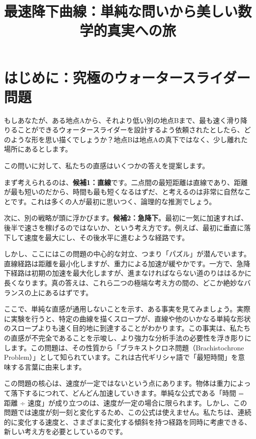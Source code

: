 \documentclass[12pt,a4paper]{ltjsarticle}
\title{最速降下曲線：単純な問いから美しい数学的真実への旅}
\author{}
\date{}
\begin{document}
\maketitle

\section{はじめに：究極のウォータースライダー問題}

もしあなたが、ある地点Aから、それより低い別の地点Bまで、最も速く滑り降りることができるウォータースライダーを設計するよう依頼されたとしたら、どのような形を思い描くでしょうか？地点Bは地点Aの真下ではなく、少し離れた場所にあるとします。

この問いに対して、私たちの直感はいくつかの答えを提案します。

まず考えられるのは、\textbf{候補1：直線}です。二点間の最短距離は直線であり、距離が最も短いのだから、時間も最も短くなるはずだ、と考えるのは非常に自然なことです。これは多くの人が最初に思いつく、論理的な推測でしょう。

次に、別の戦略が頭に浮かびます。\textbf{候補2：急降下}。最初に一気に加速すれば、後半で速さを稼げるのではないか、という考え方です。例えば、最初に垂直に落下して速度を最大にし、その後水平に進むような経路です。

しかし、ここにはこの問題の中心的な対立、つまり「パズル」が潜んでいます。直線経路は距離を最小化しますが、重力による加速が緩やかです。一方で、急降下経路は初期の加速を最大化しますが、進まなければならない道のりははるかに長くなります。真の答えは、これら二つの極端な考え方の間の、どこか絶妙なバランスの上にあるはずです。

ここで、単純な直感が通用しないことを示す、ある事実を見てみましょう。実際に実験を行うと、特定の曲線を描くスロープが、直線や他のいかなる単純な形状のスロープよりも速く目的地に到達することがわかります。この事実は、私たちの直感が不完全であることを示唆し、より強力な分析手法の必要性を浮き彫りにします。この問題は、その性質から「ブラキストクロネ問題（Brachistochrone Problem）」として知られています。これは古代ギリシャ語で「最短時間」を意味する言葉に由来します。

この問題の核心は、速度が一定ではないという点にあります。物体は重力によって落下するにつれて、どんどん加速していきます。単純な公式である「時間 = 距離 ÷ 速度」が成り立つのは、速度が一定の場合に限られます。しかし、この問題では速度が刻一刻と変化するため、この公式は使えません。私たちは、連続的に変化する速度と、さまざまに変化する傾斜を持つ経路を同時に考慮できる、新しい考え方を必要としているのです。
\end{document}
